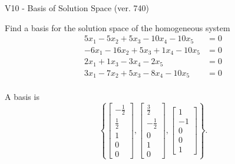 \begin{exercise}
  \begin{exerciseTitle}V10 - Basis of Solution Space (ver. 740)\end{exerciseTitle}
  \begin{exerciseStatement}
    Find a basis for the solution space of the homogeneous system 
\begin{align*}
 5 x_ 1 -5 x_ 2 + 5 x_ 3 -10 x_ 4 -10 x_ 5 &= 0  \\ 
  -6 x_ 1 -16 x_ 2 + 5 x_ 3 + 1 x_ 4 -10 x_ 5 &= 0  \\ 
  2 x_ 1 + 1 x_ 3 -3 x_ 4 -2 x_ 5 &= 0  \\ 
  3 x_ 1 -7 x_ 2 + 5 x_ 3 -8 x_ 4 -10 x_ 5 &= 0  \\ 
 \end{align*}


 
  \end{exerciseStatement}

  \begin{exerciseAnswer}
   A basis is   
\[\left\{\left[\begin{array}{c}
-\frac{1}{2} \\
\frac{1}{2} \\
1 \\
0 \\
0
\end{array}\right] , \left[\begin{array}{c}
\frac{3}{2} \\
-\frac{1}{2} \\
0 \\
1 \\
0
\end{array}\right] , \left[\begin{array}{c}
1 \\
-1 \\
0 \\
0 \\
1
\end{array}\right]\right\}.\]

  


  \end{exerciseAnswer}
\end{exercise}
